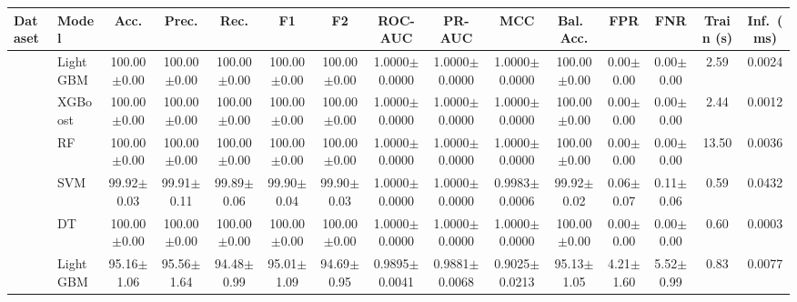 \begin{tabular}{@{}llccccccccccccc@{}}
\toprule
\textbf{Dataset} & \textbf{Model} & \textbf{Acc.} & \textbf{Prec.} & \textbf{Rec.} & \textbf{F1} & \textbf{F2} & \textbf{ROC-AUC} & \textbf{PR-AUC} & \textbf{MCC} & \textbf{Bal.\ Acc.} & \textbf{FPR} & \textbf{FNR} & \textbf{Train (s)} & \textbf{Inf.\ (ms)}\\
\midrule
{} & LightGBM & 100.00{\tiny$\pm$0.00} & 100.00{\tiny$\pm$0.00} & 100.00{\tiny$\pm$0.00} & 100.00{\tiny$\pm$0.00} & 100.00{\tiny$\pm$0.00} & 1.0000{\tiny$\pm$0.0000} & 1.0000{\tiny$\pm$0.0000} & 1.0000{\tiny$\pm$0.0000} & 100.00{\tiny$\pm$0.00} & 0.00{\tiny$\pm$0.00} & 0.00{\tiny$\pm$0.00} & 2.59 & 0.0024\\
 & XGBoost & 100.00{\tiny$\pm$0.00} & 100.00{\tiny$\pm$0.00} & 100.00{\tiny$\pm$0.00} & 100.00{\tiny$\pm$0.00} & 100.00{\tiny$\pm$0.00} & 1.0000{\tiny$\pm$0.0000} & 1.0000{\tiny$\pm$0.0000} & 1.0000{\tiny$\pm$0.0000} & 100.00{\tiny$\pm$0.00} & 0.00{\tiny$\pm$0.00} & 0.00{\tiny$\pm$0.00} & 2.44 & 0.0012\\
 & RF & 100.00{\tiny$\pm$0.00} & 100.00{\tiny$\pm$0.00} & 100.00{\tiny$\pm$0.00} & 100.00{\tiny$\pm$0.00} & 100.00{\tiny$\pm$0.00} & 1.0000{\tiny$\pm$0.0000} & 1.0000{\tiny$\pm$0.0000} & 1.0000{\tiny$\pm$0.0000} & 100.00{\tiny$\pm$0.00} & 0.00{\tiny$\pm$0.00} & 0.00{\tiny$\pm$0.00} & 13.50 & 0.0036\\
 & SVM & 99.92{\tiny$\pm$0.03} & 99.91{\tiny$\pm$0.11} & 99.89{\tiny$\pm$0.06} & 99.90{\tiny$\pm$0.04} & 99.90{\tiny$\pm$0.03} & 1.0000{\tiny$\pm$0.0000} & 1.0000{\tiny$\pm$0.0000} & 0.9983{\tiny$\pm$0.0006} & 99.92{\tiny$\pm$0.02} & 0.06{\tiny$\pm$0.07} & 0.11{\tiny$\pm$0.06} & 0.59 & 0.0432\\
 & DT & 100.00{\tiny$\pm$0.00} & 100.00{\tiny$\pm$0.00} & 100.00{\tiny$\pm$0.00} & 100.00{\tiny$\pm$0.00} & 100.00{\tiny$\pm$0.00} & 1.0000{\tiny$\pm$0.0000} & 1.0000{\tiny$\pm$0.0000} & 1.0000{\tiny$\pm$0.0000} & 100.00{\tiny$\pm$0.00} & 0.00{\tiny$\pm$0.00} & 0.00{\tiny$\pm$0.00} & 0.60 & 0.0003\\
\midrule
{} & LightGBM & 95.16{\tiny$\pm$1.06} & 95.56{\tiny$\pm$1.64} & 94.48{\tiny$\pm$0.99} & 95.01{\tiny$\pm$1.09} & 94.69{\tiny$\pm$0.95} & 0.9895{\tiny$\pm$0.0041} & 0.9881{\tiny$\pm$0.0068} & 0.9025{\tiny$\pm$0.0213} & 95.13{\tiny$\pm$1.05} & 4.21{\tiny$\pm$1.60} & 5.52{\tiny$\pm$0.99} & 0.83 & 0.0077\\

\end{tabular}
